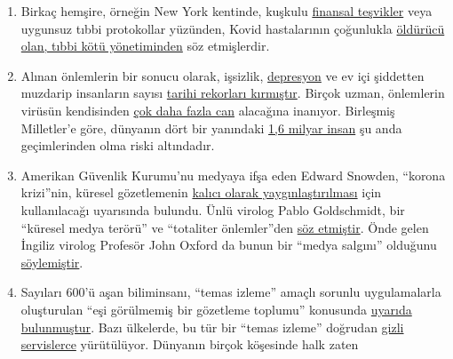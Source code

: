 \begin{enumerate}
{  gerçekdışı varsayımlara} dayanmaktadır.
\item
  Birkaç hemşire, örneğin New York kentinde, kuşkulu
  \href{https://eu.usatoday.com/story/news/factcheck/2020/04/24/fact-check-medicare-hospitals-paid-more-covid-19-patients-coronavirus/3000638001/}{finansal
  teşvikler} veya uygunsuz tıbbi protokollar yüzünden, Kovid
  hastalarının çoğunlukla
  \href{https://www.youtube.com/watch?v=UIDsKdeFOmQ}{öldürücü olan,
  tıbbi kötü yönetiminden} söz etmişlerdir.
\item
  Alınan önlemlerin bir sonucu olarak, işsizlik,
  \href{https://www.indystar.com/story/news/health/2020/04/03/coronavirus-indiana-how-get-help-mental-health-addiction/5104357002/}{depresyon}
  ve ev içi şiddetten muzdarip insanların sayısı
  \href{https://www.businessinsider.com/us-weekly-jobless-claims-unemployment-filings-coronavirus-labor-market-layoffs-2020-5}{tarihi
  rekorları kırmıştır}. Birçok uzman, önlemlerin virüsün kendisinden
  \href{https://www.nytimes.com/2020/03/20/opinion/coronavirus-pandemic-social-distancing.html}{çok
  daha fazla can} alacağına inanıyor. Birleşmiş Milletler'e göre,
  dünyanın dört bir yanındaki
  \href{https://www.theguardian.com/world/2020/apr/29/half-of-worlds-workers-at-immediate-risk-of-losing-livelihood-due-to-coronavirus}{1,6
  milyar insan} şu anda geçimlerinden olma riski altındadır.
\item
  Amerikan Güvenlik Kurumu'nu medyaya ifşa eden Edward Snowden, ``korona
  krizi''nin, küresel gözetlemenin
  \href{https://www.youtube.com/watch?v=-pcQFTzck_c}{kalıcı olarak
  yaygınlaştırılması} için kullanılacağı uyarısında bulundu. Ünlü
  virolog Pablo Goldschmidt, bir ``küresel medya terörü'' ve ``totaliter
  önlemler''den
  \href{https://www.rubikon.news/artikel/der-corona-totalitarismus}{söz
  etmiştir}. Önde gelen İngiliz virolog Profesör John Oxford da bunun
  bir ``medya salgını''
  olduğunu\href{https://novuscomms.com/2020/03/31/a-view-from-the-hvivo-open-orphan-orph-laboratory-professor-john-oxford/}{
  söylemiştir}.
\item
  Sayıları 600'ü aşan biliminsanı, ``temas izleme'' amaçlı sorunlu
  uygulamalarla oluşturulan ``eşi görülmemiş bir gözetleme toplumu''
  konusunda
  \href{https://www.esat.kuleuven.be/cosic/sites/contact-tracing-joint-statement/}{uyarıda
  bulunmuştur}. Bazı ülkelerde, bu tür bir ``temas izleme'' doğrudan
  \href{https://www.jewishpress.com/news/the-courts/state-to-high-court-even-more-shin-bet-involvement-in-fighting-the-coronavirus/2020/04/14/}{gizli
  servislerce} yürütülüyor. Dünyanın birçok köşesinde halk zaten

\end{enumerate}
